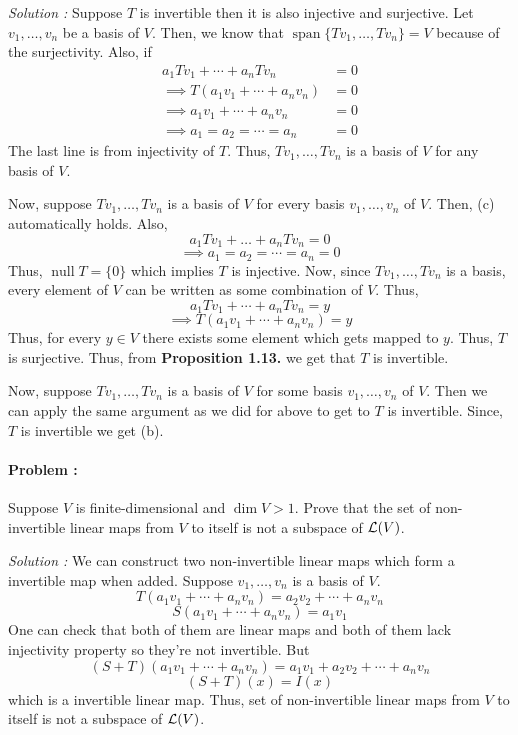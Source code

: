 \vspace{4mm}
\textit{Solution :} Suppose $T$ is invertible then it is also injective and surjective. Let $v_1, \ldots, v_n$ be a basis of $V$.
Then, we know that $\operatorname{span}\{Tv_1,\ldots,Tv_n\} = V$ because of the surjectivity. Also, if 
\begin{align*}
    a_1 Tv_1 + \cdots + a_n Tv_n &= 0 \\
    \implies T(a_1v_1 + \cdots + a_n v_n) &= 0 \\
    \implies a_1 v_1 + \cdots + a_n v_n &= 0 \\
    \implies a_1=a_2=\cdots=a_n&=0
\end{align*}
The last line is from injectivity of $T$. Thus, $Tv_1, \ldots, Tv_n$ is a basis of $V$ for any basis of $V$.

Now, suppose $Tv_1,\ldots,Tv_n$ is a basis of $V$ for every basis $v_1,\ldots,v_n$ of $V$. Then, (c) automatically holds. Also,
\[ a_1 Tv_1 + \ldots + a_n Tv_n = 0 \]
\[ \implies a_1 = a_2 = \cdots = a_n = 0 \]
Thus, $\operatorname{null} T = \{0\}$ which implies $T$ is injective. Now, since $Tv_1,\ldots,Tv_n$ is a basis, every element of $V$ can 
be written as some combination of $V$. Thus,
\[ a_1 Tv_1 + \cdots + a_n Tv_n = y \]
\[ \implies T(a_1 v_1 + \cdots + a_n v_n) = y \]
Thus, for every $y \in V$ there exists some element which gets mapped to $y$. Thus, $T$ is surjective. Thus, from \textbf{Proposition 1.13.}
we get that $T$ is invertible.

Now, suppose $Tv_1,\ldots,Tv_n$ is a basis of $V$ for some basis $v_1, \ldots,v_n$ of $V$. Then we can apply the same argument as we did 
for above to get to $T$ is invertible. Since, $T$ is invertible we get (b).

\paragraph{Problem :} Suppose $V$ is finite-dimensional and $\dim V > 1$. Prove that the set of non-invertible linear maps from $V$ to 
itself is not a subspace of $\operatorname{\mathcal{L}}(V)$.

\vspace{4mm}
\textit{Solution :} We can construct two non-invertible linear maps which form a invertible map when added.
Suppose $v_1, \ldots, v_n$ is a basis of $V$. 
\[ T(a_1 v_1 + \cdots + a_n v_n ) = a_2 v_2 + \cdots + a_n v_n \]
\[ S(a_1 v_1 + \cdots + a_n v_n ) = a_1 v_1 \]
One can check that both of them are linear maps and both of them lack injectivity property so they're not invertible.
But 
\[ (S+T)(a_1 v_1 + \cdots + a_n v_n ) = a_1 v_1 + a_2 v_2 + \cdots + a_n v_n \]
\[ (S+T)(x)=I(x) \]
which is a invertible linear map. Thus, set of non-invertible linear maps from $V$ to itself is not a subspace of $\operatorname{\mathcal{L}}(V)$.


